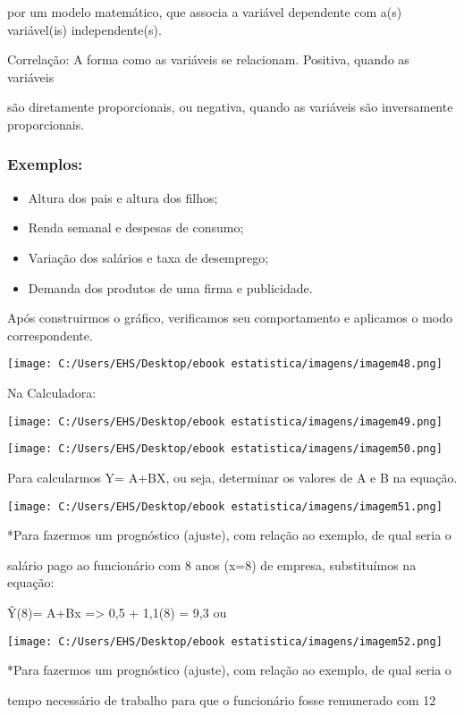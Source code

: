 \documentclass[]{book}
\begin{document}
por um modelo matemático, que associa a variável dependente com a(s) variável(is) independente(s).

Correlação: A forma como as variáveis se relacionam. Positiva, quando as variáveis

são diretamente proporcionais, ou negativa, quando as variáveis são inversamente proporcionais.

\hypertarget{exemplos}{%
\subsubsection{Exemplos:}\label{exemplos}}

\begin{itemize}
\item
  Altura dos pais e altura dos filhos;
\item
  Renda semanal e despesas de consumo;
\item
  Variação dos salários e taxa de desemprego;
\item
  Demanda dos produtos de uma firma e publicidade.
\end{itemize}

Após construirmos o gráfico, verificamos seu comportamento e aplicamos o modo correspondente.

\texttt{[image: C:/Users/EHS/Desktop/ebook estatistica/imagens/imagem48.png]}

Na Calculadora:

\texttt{[image: C:/Users/EHS/Desktop/ebook estatistica/imagens/imagem49.png]}

\texttt{[image: C:/Users/EHS/Desktop/ebook estatistica/imagens/imagem50.png]}

Para calcularmos Y= A+BX, ou seja, determinar os valores de A e B na equação.

\texttt{[image: C:/Users/EHS/Desktop/ebook estatistica/imagens/imagem51.png]}

*Para fazermos um prognóstico (ajuste), com relação ao exemplo, de qual seria
o

salário pago ao funcionário com 8 anos (x=8) de empresa, substituímos na equação:

Ŷ(8)= A+Bx =\textgreater{} 0,5 + 1,1(8) = 9,3 ou

\texttt{[image: C:/Users/EHS/Desktop/ebook estatistica/imagens/imagem52.png]}

*Para fazermos um prognóstico (ajuste), com relação ao exemplo, de qual seria o

tempo necessário de trabalho para que o funcionário fosse remunerado com 12
\end{document}

